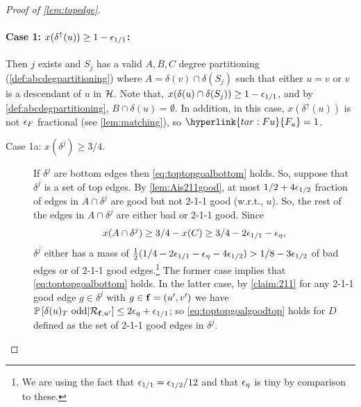 \begin{proof}[Proof of \cref{lem:topedge}]
\paragraph{Case 1: $ x(\delta^\uparrow (u)) \ge 1- {\epsilon}_{1/1}$:}
Then $j$ exists and $S_j$ has a valid $A,B,C$ degree partitioning (\cref{def:abcdegpartitioning}) where $A = \delta(v) \cap \delta (S_j)$ such that either $u=v$ or $v$ is a descendant of $u$ in $\mathcal{H}$. Note that, $x(\delta(u) \cap \delta(S_j)) \ge 1-{\epsilon}_{1/1}$, and by \cref{def:abcdegpartitioning}, $B \cap \delta(u) = \emptyset$. In addition, in this case, $x(\delta^\uparrow(u))$ is not ${\epsilon}_F$ fractional (see \cref{lem:matching}), so $\hyperlink{tar:Fu}{F_u}=1$. 
\begin{description}
\item [Case 1a:  $x(\delta^{j}) \ge 3/4$.]
If $\delta^j$ are bottom edges then \eqref{eq:toptopgoalbottom} holds. %
So, suppose that $\delta^j$ is a set of top edges.  
By \cref{lem:Ais211good}, at most $1/2+4{\epsilon}_{1/2}$ fraction of edges in $A\cap \delta^j$ are good but not 2-1-1 good (w.r.t., $u$). 
So, the rest of the edges in $A\cap\delta^j$ are either bad or 2-1-1 good. Since 
$$x(A\cap\delta^j)\geq 3/4-x(C)\ge  3/4-2{\epsilon}_{1/1}-{\epsilon}_\eta,$$
$\delta^j$ either has a mass  of $\frac12(1/4 - 2 {\epsilon}_{1/1} - {\epsilon}_\eta- 4 {\epsilon}_{1/2} ) > 1/8 - 3 {\epsilon}_{1/2}$ of  bad edges or of 2-1-1 good edges.\footnote{We are using the fact that ${\epsilon}_{1/1} ={\epsilon}_{1/2}/12 $ and that ${\epsilon}_\eta$ is tiny by comparison to these.}
The former case implies that \eqref{eq:toptopgoalbottom} holds. In  the latter case, by \cref{claim:211} for any 2-1-1 good edge $g\in \delta^j$ with $g\in{\bf f}=(u',v')$ we have  ${\mathbb{P}}\left[\delta(u)_T\text{ odd} | {\mathcal{R}}_{{\bf f},u'}\right] \leq 2{\epsilon}_\eta + {\epsilon}_{1/1}$; so  \eqref{eq:toptopgoalgoodtop}  holds for $D$ defined as the set of 2-1-1 good edges in $\delta^j$.


\end{description}
\end{proof}
